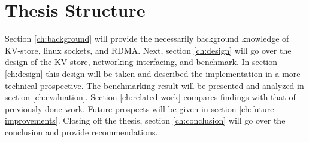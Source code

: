 \section{Thesis Structure}
Section \ref{ch:background} will provide the necessarily background knowledge of KV-store, linux sockets, and RDMA.
Next, section \ref{ch:design} will go over the design of the KV-store, networking interfacing, and benchmark.
In section \ref{ch:design} this design will be taken and described the implementation in a more technical prospective.
The benchmarking result will be presented and analyzed in section \ref{ch:evaluation}.
Section \ref{ch:related-work} compares findings with that of previously done work.
Future prospects will be given in section \ref{ch:future-improvements}.
Closing off the thesis, section \ref{ch:conclusion} will go over the conclusion and provide recommendations.